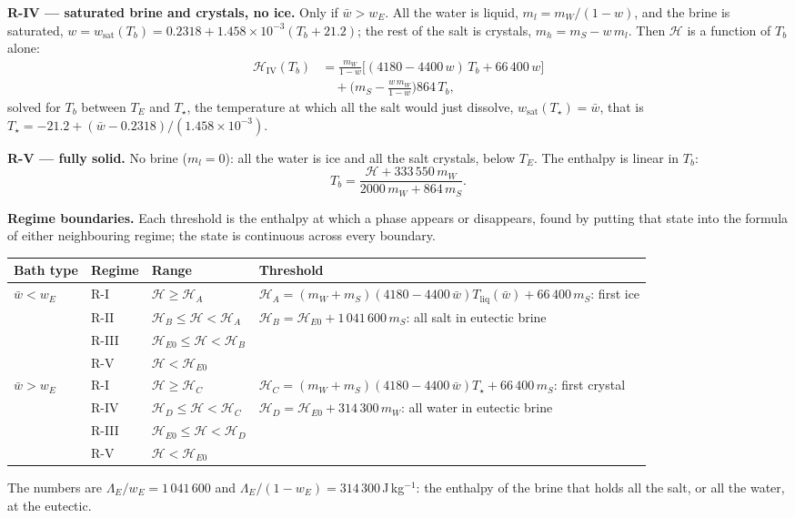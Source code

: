 \documentclass[11pt,a4paper]{article}
\newcommand{\Hb}{\mathcal{H}}
\newcommand{\Tliq}{T_{\mathrm{liq}}}
\newcommand{\wsat}{w_{\mathrm{sat}}}
\newcommand{\sub}[1]{\par\smallskip\noindent\textbf{#1}\enspace}
\begin{document}
\sub{R-IV --- saturated brine and crystals, no ice.} Only if $\bar w>w_E$. All the water is liquid,
$m_l = m_W/(1-w)$, and the brine is saturated, $w = \wsat(T_b) = 0.2318 + 1.458\times10^{-3}(T_b + 21.2)$; the
rest of the salt is crystals, $m_h = m_S - w\,m_l$. Then $\Hb$ is a function of $T_b$ alone:
\begin{align*}
\Hb_{\mathrm{IV}}(T_b) &= \frac{m_W}{1-w}\big[(4180 - 4400\,w)\,T_b + 66\,400\,w\big]\\
&\quad + \Big(m_S - \frac{w\,m_W}{1-w}\Big)864\,T_b,
\end{align*}
solved for $T_b$ between $T_E$ and $T_\star$, the temperature at which all the salt would just dissolve,
$\wsat(T_\star)=\bar w$, that is $T_\star = -21.2 + (\bar w - 0.2318)/(1.458\times10^{-3})$.

\sub{R-V --- fully solid.} No brine ($m_l=0$): all the water is ice and all the salt crystals, below $T_E$.
The enthalpy is linear in $T_b$:
\[ T_b = \frac{\Hb + 333\,550\,m_W}{2000\,m_W + 864\,m_S}. \]

\textbf{Regime boundaries.} Each threshold is the enthalpy at which a phase appears or disappears, found by
putting that state into the formula of either neighbouring regime; the state is continuous across every
boundary.

{\small
\begin{tabularx}{\linewidth}{l l l X}
\toprule
Bath type & Regime & Range & Threshold \\
\midrule
$\bar w<w_E$ & R-I & $\Hb\ge\Hb_A$ & $\Hb_A = (m_W+m_S)(4180 - 4400\,\bar w)\Tliq(\bar w) + 66\,400\,m_S$: first ice \\
 & R-II & $\Hb_B\le\Hb<\Hb_A$ & $\Hb_B = \Hb_{E0} + 1\,041\,600\,m_S$: all salt in eutectic brine \\
 & R-III & $\Hb_{E0}\le\Hb<\Hb_B$ & \\
 & R-V & $\Hb<\Hb_{E0}$ & \\
\midrule
$\bar w>w_E$ & R-I & $\Hb\ge\Hb_C$ & $\Hb_C = (m_W+m_S)(4180 - 4400\,\bar w)T_\star + 66\,400\,m_S$: first crystal \\
 & R-IV & $\Hb_D\le\Hb<\Hb_C$ & $\Hb_D = \Hb_{E0} + 314\,300\,m_W$: all water in eutectic brine \\
 & R-III & $\Hb_{E0}\le\Hb<\Hb_D$ & \\
 & R-V & $\Hb<\Hb_{E0}$ & \\
\bottomrule
\end{tabularx}}

The numbers are $\Lambda_E/w_E = 1\,041\,600$ and $\Lambda_E/(1-w_E) = 314\,300$\,J\,kg$^{-1}$: the enthalpy
of the brine that holds all the salt, or all the water, at the eutectic.
\end{document}
